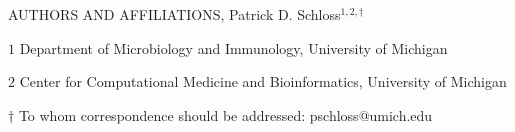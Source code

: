 
\begin{center}
\vspace{25mm}

AUTHORS AND AFFILIATIONS, Patrick D. Schloss$^{1,2,\dagger}$

\vspace{20mm}

$1$ Department of Microbiology and Immunology, University of Michigan

$2$ Center for Computational Medicine and Bioinformatics, University of Michigan

\vspace{30mm}

$\dagger$ To whom correspondence should be addressed: pschloss@umich.edu

\end{center}


\newpage
\linenumbers
